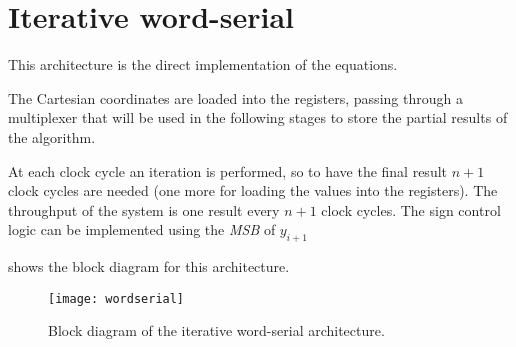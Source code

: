 \section{Iterative word-serial}\label{sec:wordserial}

This architecture is the direct implementation of the \cordic{} equations.

The Cartesian coordinates are loaded into the registers, passing through a
multiplexer that will be used in the following stages to store the partial
results of the algorithm.

At each clock cycle an iteration is performed, so to have the final result
\(n+1\) clock cycles are needed (one more for loading the values into the
registers). The throughput of the system is one result every \(n+1\) clock
cycles. The sign control logic can be implemented using the \textit{MSB} of
\(y_{i+1}\)

 shows the block diagram for this architecture.

\begin{figure}[hb]
	\texttt{[image: wordserial]}
	\caption{Block diagram of the iterative word-serial architecture.}\label{fig:wordserial}
\end{figure}
